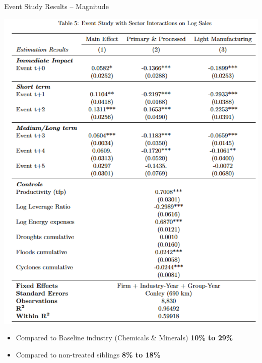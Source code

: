 \documentclass[
  xcolor=svgnames,
  bookmarks=true,
  bookmarksopen=true,
  pdfborder={0 0 0},
  pdfhighlight={/N},
  linkbordercolor={rgb}{0.5,0.5,0.5},
  implicit=false,
  colorlinks=true,
  allcolors=deepblue
]{beamer}
\begin{document}
\begin{frame}{Event Study Results -- Magnitude}

\centering
    \includegraphics[height = 7 cm]{Table Results Prim and Manuf.png}
\begin{itemize}
\scriptsize
    \item Compared to Baseline industry (Chemicals \& Minerals) \textbf{10\% to 29\%}
    \item Compared to non-treated siblings \textbf{8\% to 18\%}
\end{itemize}
\end{frame}
\end{document}
